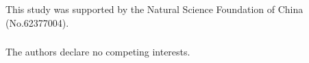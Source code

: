 \documentclass[runningheads]{llncs}
\begin{document}
\begin{credits}
\subsubsection{\ackname} 
This study was supported by the Natural Science Foundation of China (No.62377004).

\subsubsection{\discintname}
The authors declare no competing interests.
\end{credits}



\end{document}
